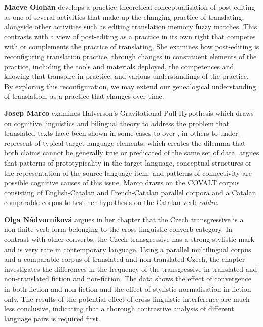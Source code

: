 \begin{refsection}
\textbf{Maeve Olohan} develops a practice-theoretical conceptualisation of post-edi\-ting as one of several activities that make up the changing practice of translating, alongside other activities such as editing translation memory fuzzy matches. This contrasts with a view of post-editing as a practice in its own right that competes with or complements the practice of translating. She examines how post-editing is reconfiguring translation practice, through changes in constituent elements of the practice, including the tools and materials deployed, the competences and knowing that transpire in practice, and various understandings of the practice. By exploring this reconfiguration, we may extend our genealogical understanding of translation, as a practice that changes over time.

\hspace*{-1mm}\textbf{Josep Marco} examines Halverson's \parencite*{halverson10} Gravitational Pull Hypothesis which draws on cognitive linguistics and bilingual theory to address the problem that translated texts have been shown in some cases to over-, in others to under-represent of typical target language elements, which creates the dilemma that both claims cannot be generally true or predicated of the same set of data. \textcite{halverson10} argues that patterns of prototypicality in the target language, conceptual structures or the representation of the source language item, and patterns of connectivity are possible cognitive causes of this issue. Marco draws on the COVALT corpus consisting of English-Catalan and French-Catalan parallel corpora and a Catalan comparable corpus to test her hypothesis on the Catalan verb \textit{caldre}.

\textbf{Olga Nádvorníková} argues in her chapter that the Czech transgressive is a non-finite verb form belonging to the cross-linguistic converb category. In contrast with other converbs, the Czech transgressive has a strong stylistic mark and is very rare in contemporary language. Using a parallel multilingual corpus and a comparable corpus of translated and non-translated Czech, the chapter investigates the differences in the frequency of the transgressive in translated and non-translated fiction and non-fiction. The data shows the effect of convergence in both fiction and non-fiction and the effect of stylistic normalisation in fiction only. The results of the potential effect of cross-linguistic interference are much less conclusive, indicating that a thorough contrastive analysis of different language pairs is required first.


\end{refsection}
